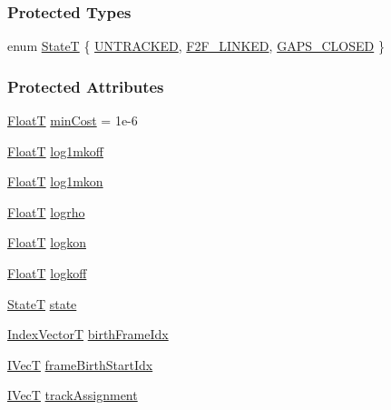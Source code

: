 \subsubsection*{Protected Types}
\begin{DoxyCompactItemize}
\item 
enum \hyperlink{classtracker_1_1LAPTrack_ae474c311508c7e37bfd9080f3885f59b}{StateT} \{ \hyperlink{classtracker_1_1LAPTrack_ae474c311508c7e37bfd9080f3885f59ba0cb22a66c6ed4baeddea761814bb8bda}{U\+N\+T\+R\+A\+C\+K\+ED}, 
\hyperlink{classtracker_1_1LAPTrack_ae474c311508c7e37bfd9080f3885f59ba1f595bb9aff13fb50048ffda22ad8e73}{F2\+F\+\_\+\+L\+I\+N\+K\+ED}, 
\hyperlink{classtracker_1_1LAPTrack_ae474c311508c7e37bfd9080f3885f59bae1bc3dd81f059d3b28c1338111878699}{G\+A\+P\+S\+\_\+\+C\+L\+O\+S\+ED}
 \}
\end{DoxyCompactItemize}
\subsubsection*{Protected Attributes}
\begin{DoxyCompactItemize}
\item 
\hyperlink{classtracker_1_1Tracker_a66e8a81f12871e23082264c964f8f103}{FloatT} \hyperlink{classtracker_1_1LAPTrack_a6909c7f712dc8abbde326ef7c77d3885}{min\+Cost} = 1e-\/6
\item 
\hyperlink{classtracker_1_1Tracker_a66e8a81f12871e23082264c964f8f103}{FloatT} \hyperlink{classtracker_1_1LAPTrack_a0d698061ef3117aed73b71975b217ef1}{log1mkoff}
\item 
\hyperlink{classtracker_1_1Tracker_a66e8a81f12871e23082264c964f8f103}{FloatT} \hyperlink{classtracker_1_1LAPTrack_ac0e506d8b8b4e29689cbf2a112f86df4}{log1mkon}
\item 
\hyperlink{classtracker_1_1Tracker_a66e8a81f12871e23082264c964f8f103}{FloatT} \hyperlink{classtracker_1_1LAPTrack_a95e4746d8eac4e665e0bb34be5ad4198}{logrho}
\item 
\hyperlink{classtracker_1_1Tracker_a66e8a81f12871e23082264c964f8f103}{FloatT} \hyperlink{classtracker_1_1LAPTrack_ac257b647714df10faf5c3bc15ae9ed43}{logkon}
\item 
\hyperlink{classtracker_1_1Tracker_a66e8a81f12871e23082264c964f8f103}{FloatT} \hyperlink{classtracker_1_1LAPTrack_a75af05f0cad86fd46bcb32ac63e36abb}{logkoff}
\item 
\hyperlink{classtracker_1_1LAPTrack_ae474c311508c7e37bfd9080f3885f59b}{StateT} \hyperlink{classtracker_1_1LAPTrack_a0e74c48780822951efdc3570348a3dd5}{state}
\item 
\hyperlink{classtracker_1_1Tracker_a50ae514521f940c08813b45f53b6ce2d}{Index\+VectorT} \hyperlink{classtracker_1_1LAPTrack_a56dd0c2e669f3311471a817d2c12595c}{birth\+Frame\+Idx}
\item 
\hyperlink{classtracker_1_1Tracker_a59a6e01be987f9c0093a8ac5ad97ce33}{I\+VecT} \hyperlink{classtracker_1_1LAPTrack_a19b9e3e8cc4e908fa2e3816f386a7f27}{frame\+Birth\+Start\+Idx}
\item 
\hyperlink{classtracker_1_1Tracker_a59a6e01be987f9c0093a8ac5ad97ce33}{I\+VecT} \hyperlink{classtracker_1_1Tracker_a638ecbd5a6466c2730e7c7b9561e9fc9}{track\+Assignment}
\end{DoxyCompactItemize}
